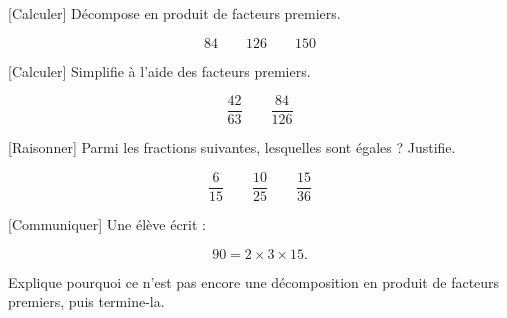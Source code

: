 \documentclass[12pt,a4paper]{article}
\begin{document}

[Calculer]
Décompose en produit de facteurs premiers. 

\[
84\qquad 126\qquad 150
\]


[Calculer]
Simplifie à l'aide des facteurs premiers. 

\[
\frac{42}{63}
\qquad
\frac{84}{126}
\]


[Raisonner]
Parmi les fractions suivantes, lesquelles sont égales ?
Justifie. 

\[
\frac{6}{15}
\qquad
\frac{10}{25}
\qquad
\frac{15}{36}
\]


[Communiquer]
Une élève écrit :

\[
90=2\times3\times15.
\]

Explique pourquoi ce n'est pas encore une décomposition
en produit de facteurs premiers, puis termine-la. 

\end{document}
